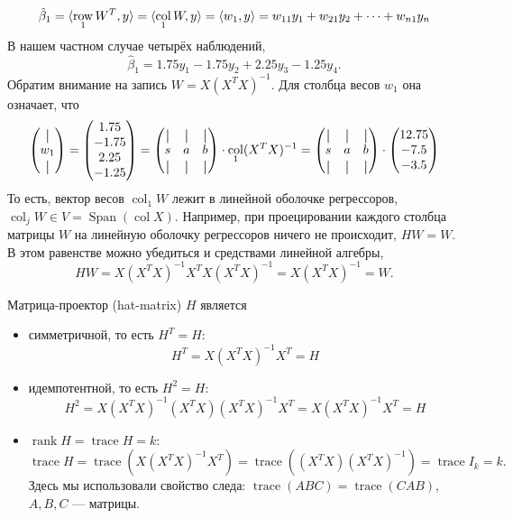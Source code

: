 \documentclass[12pt]{article}
\DeclareMathOperator{\col}{col}
\DeclareMathOperator{\row}{row}
\DeclareMathOperator{\trace}{trace}
\DeclareMathOperator{\rank}{rank}
\DeclareMathOperator{\Span}{Span}
\DeclarePairedDelimiter{\scalp}{\langle}{\rangle}
\newcommand*{\vertbar}{\rule[-1ex]{0.5pt}{2.5ex}}
\newcommand{\hb}{\hat{\beta}}
\begin{document}
\[
\hb_1 = \scalp{\row_1 W^T, y} = \scalp{\col_1 W, y} = \scalp{w_1, y}  = w_{11}y_1 + w_{21} y_2 + \dots + w_{n1} y_n 
\]
В нашем частном случае четырёх наблюдений,
\[
\hb_1 = 1.75 y_1 - 1.75 y_2 + 2.25y_3 - 1.25 y_4.
\]
Обратим внимание на запись $W = X(X^TX)^{-1}$.
Для столбца весов $w_1$ она означает, что
\[
\begin{pmatrix}
    \vertbar \\
    w_1 \\
    \vertbar
\end{pmatrix} =
\begin{pmatrix}
    1.75 \\
    -1.75 \\
    2.25 \\
    -1.25
\end{pmatrix} =
\begin{pmatrix}
    \vertbar & \vertbar & \vertbar \\
    s & a & b \\
    \vertbar & \vertbar & \vertbar \\    
\end{pmatrix} \cdot \col_1 (X^TX)^{-1} = 
\begin{pmatrix}
    \vertbar & \vertbar & \vertbar \\
    s & a & b \\
    \vertbar & \vertbar & \vertbar \\    
\end{pmatrix} \cdot \begin{pmatrix}
    12.75 \\
    -7.5 \\
    -3.5 \\
\end{pmatrix}
\]
То есть, вектор весов $\col_1 W$ лежит в линейной оболочке регрессоров, $\col_j W \in V = \Span(\col X)$.
Например, при проецировании каждого столбца матрицы $W$ на линейную оболочку регрессоров ничего не происходит, $HW = W$.
В этом равенстве можно убедиться и средствами линейной алгебры,
\[
HW = X(X^TX)^{-1} X^T X(X^TX)^{-1} = X(X^TX)^{-1} = W.
\]



Матрица-проектор (hat-matrix) $H$ является
\begin{itemize}
    \item симметричной, то есть $H^T = H$:
    \[
    H^T = X(X^{T}X)^{-1}X^{T} = H
    \]
    \item идемпотентной, то есть $H^2 = H$:
    \[
    H^2 =  X(X^{T}X)^{-1}(X^{T}X)(X^{T}X)^{-1}X^{T} = X(X^{T}X)^{-1}X^{T} = H
    \]
    \item $\rank H = \trace H = k$:
    \[
    \trace H = \trace (X(X^{T}X)^{-1}X^{T}) = \trace ((X^{T}X)(X^{T}X)^{-1}) = \trace I_k = k.
    \]
    Здесь мы использовали свойство следа: $\trace(ABC) = \trace(CAB)$, $A,B,C$ — матрицы.
\end{itemize}
\end{document}
